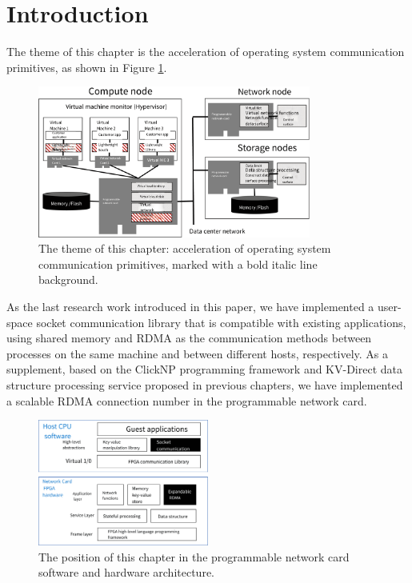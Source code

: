 \section{Introduction}
\label{socksdirect:sec:intro}

The theme of this chapter is the acceleration of operating system communication primitives, as shown in Figure \ref{socksdirect:fig:sys-arch}.

\begin{figure}[htbp]
	\centering
	\includegraphics[width=0.8\textwidth]{images/sys_arch.pdf}
	\caption{The theme of this chapter: acceleration of operating system communication primitives, marked with a bold italic line background.}
	\label{socksdirect:fig:sys-arch}
\end{figure}

As the last research work introduced in this paper, we have implemented a user-space socket communication library that is compatible with existing applications, using shared memory and RDMA as the communication methods between processes on the same machine and between different hosts, respectively. As a supplement, based on the ClickNP programming framework and KV-Direct data structure processing service proposed in previous chapters, we have implemented a scalable RDMA connection number in the programmable network card.

\begin{figure}[htbp]
	\centering
	\includegraphics[width=0.5\textwidth]{images/sw_hw_codesign.pdf}
	\caption{The position of this chapter in the programmable network card software and hardware architecture.}
	\label{socksdirect:fig:sw-hw-codesign}
\end{figure}

